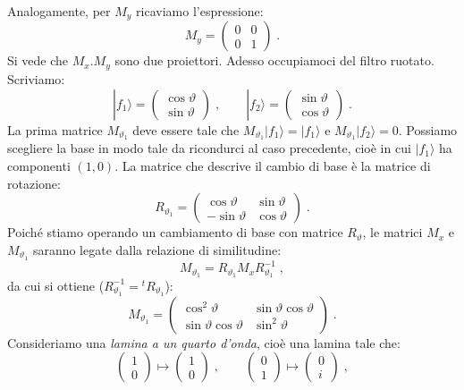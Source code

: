 \documentclass[12pt,a4paper]{report}
\theoremstyle{definition}
\numberwithin{equation}{section}
\newcommand{\ket}{\rangle}
\begin{document}
Analogamente, per $M_y$ ricaviamo l'espressione:
$$
M_y=\left(
\begin{matrix}
0 & 0 \\
0 & 1
\end{matrix}\right)\;.
$$
Si vede che $M_x.M_y$ sono due proiettori. Adesso occupiamoci del filtro ruotato. Scriviamo:
$$
|f_1\ket=\left(
\begin{matrix}
\cos\vartheta \\
\sin\vartheta
\end{matrix}\right)\;, \qquad
|f_2\ket=\left(
\begin{matrix}
\sin\vartheta \\
\cos\vartheta
\end{matrix}\right)\;.
$$
La prima matrice $M_{\vartheta_1}$ deve essere tale che $M_{\vartheta_1}|f_1\ket=|f_1\ket$ e $M_{\vartheta_1}|f_2\ket=0$. Possiamo scegliere la base in modo tale da ricondurci al caso precedente, cioè in cui $|f_1\ket$ ha componenti $(1,0)$. La matrice che descrive il cambio di base è la matrice di rotazione:
$$
R_{\vartheta_1}=\left(
\begin{matrix}
\cos\vartheta & \sin\vartheta \\
-\sin\vartheta & \cos\vartheta
\end{matrix}\right)\;.
$$
Poiché stiamo operando un cambiamento di base con matrice $R_{\vartheta}$, le matrici $M_x$ e $M_{\vartheta_1}$ saranno legate dalla relazione di similitudine:
$$
M_{\vartheta_1}=R_{\vartheta_1}M_xR_{\vartheta_1}^{-1}\;,
$$
da cui si ottiene ($R_{\vartheta_1}^{-1}={}^tR_{\vartheta_1}$):
$$
M_{\vartheta_1}=\left(
\begin{matrix}
\cos^2\vartheta & \sin\vartheta\cos\vartheta \\
\sin\vartheta\cos\vartheta & \sin^2\vartheta
\end{matrix}\right)\;.
$$
Consideriamo una \textit{lamina a un quarto d'onda}, cioè una lamina tale che:
$$
\left(\begin{matrix}
1 \\
0
\end{matrix}\right) \longmapsto \left(
\begin{matrix}
1 \\
0
\end{matrix}\right)\;, \qquad
\left(\begin{matrix}
0 \\
1
\end{matrix}\right) \longmapsto \left(
\begin{matrix}
0 \\
i
\end{matrix}\right)\;,
$$
\end{document}
